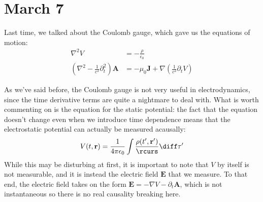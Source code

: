 \section{March 7}


Last time, we talked about the Coulomb gauge, which gave us the equations of motion:
\begin{align*}
	\nabla^2 V &= -\frac{\rho}{\epsilon_0} \\ 
	\left( \nabla^2 - \frac{1}{c^2}\partial_t^2 \right)\mathbf{A} &= -\mu_0 \mathbf{J} + \nabla\left(
	\frac{1}{c^2}\partial_t V \right)
\end{align*}

As we've said before, the Coulomb gauge is not very useful in electrodynamics, since the time derivative
terms are quite a nightmare to deal with. What is worth commenting on is the equation for the static
potential: the fact that the equation doesn't change even when we introduce time dependence means that the
electrostatic potential can actually be measured acausally:
\[
	V(t, \mathbf{r}) = \frac{1}{4 \pi \epsilon_0} \int \frac{\rho(t', \mathbf{r}')}{\rcurs} \diff \tau'
\]
While this may be disturbing at first, it is important to note that \( V \) by itself is not measurable, and
it is instead the electric field \( \mathbf{E} \) that we measure. To that end, the electric field takes on
the form \( \mathbf{E} = -\nabla V - \partial_t \mathbf{A} \), which is not instantaneous so there is no real
causality breaking here. 

